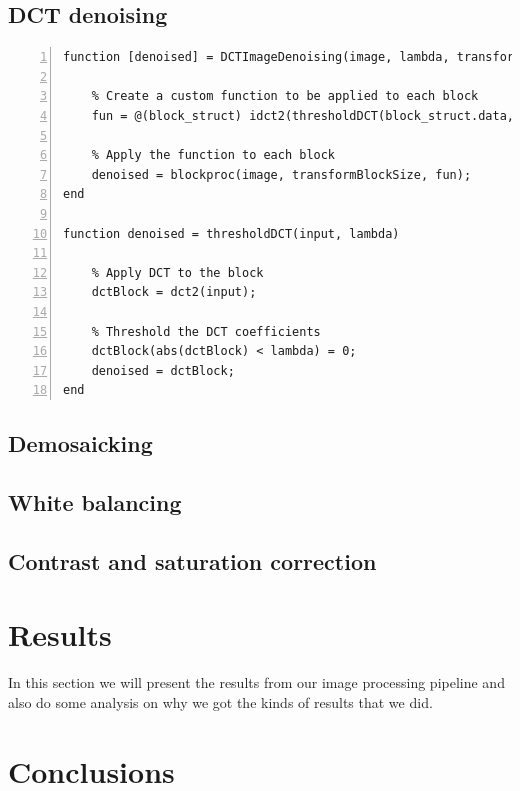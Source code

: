 \documentclass[12pt,a4paper,english
]{tunithesis}
\begin{document}
\section{DCT denoising}
\begin{lstlisting}[style=Matlab-editor, numbers=left, basicstyle=\small]
function [denoised] = DCTImageDenoising(image, lambda, transformBlockSize)

    % Create a custom function to be applied to each block
    fun = @(block_struct) idct2(thresholdDCT(block_struct.data, lambda));

    % Apply the function to each block
    denoised = blockproc(image, transformBlockSize, fun);
end

function denoised = thresholdDCT(input, lambda)

    % Apply DCT to the block
    dctBlock = dct2(input);

    % Threshold the DCT coefficients
    dctBlock(abs(dctBlock) < lambda) = 0;
    denoised = dctBlock;
end
\end{lstlisting}

\section{Demosaicking}

\section{White balancing}

\section{Contrast and saturation correction}



\chapter{Results}
\label{sec:results}
In this section we will present the results from our image processing pipeline and also do some analysis on why we got the kinds of results that we did.

\chapter{Conclusions}
\label{ch:conclusions}

%
%
\newpage

\printbibliography[title=References]
\end{document}

